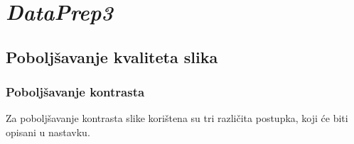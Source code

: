 \documentclass[12pt,a4paper]{article}
\begin{document}
\newpage

\section{\textit{DataPrep3}}

\subsection{Poboljšavanje kvaliteta slika}

\subsubsection{Poboljšavanje kontrasta}

Za poboljšavanje kontrasta slike korištena su tri različita postupka, koji će biti opisani u nastavku.
\end{document}
